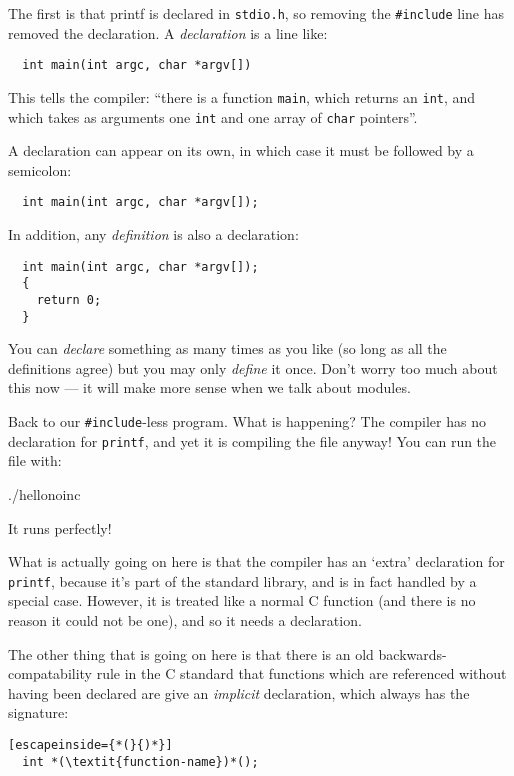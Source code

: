\documentclass[a4paper,10pt]{article}
\newcommand{\kw}[1]{\texttt{#1}}
\newcommand{\cfile}[1]{\texttt{#1}}
\begin{document}
The first is that printf is declared in \cfile{stdio.h}, so removing the
\verb!#include! line has removed the declaration. A \emph{declaration}
is a line like:

\begin{lstlisting}
  int main(int argc, char *argv[])
\end{lstlisting}


\noindent
This tells the compiler: ``there is a function \kw{main}, which
returns an \kw{int}, and which takes as arguments one \kw{int} and one
array of \kw{char} pointers''.

A declaration can appear on its own, in which case it must be followed
by a semicolon:

\begin{lstlisting}
  int main(int argc, char *argv[]);
\end{lstlisting}

\noindent
In addition, any \emph{definition} is also a declaration:

\begin{lstlisting}
  int main(int argc, char *argv[]);
  {
    return 0;
  }
\end{lstlisting}

\noindent
You can \emph{declare} something as many times as you like (so long as
all the definitions agree) but you may only \emph{define} it
once. Don't worry too much about this now --- it will make more sense
when we talk about modules.

Back to our \verb|#include|-less program. What is happening? The
compiler has no declaration for \kw{printf}, and yet it is compiling
the file anyway! You can run the file with:

./hellonoinc
\END

\noindent
It runs perfectly!

What is actually going on here is that the compiler has an `extra'
declaration for \kw{printf}, because it's part of the standard
library, and is in fact handled by a special case. However, it is
treated like a normal C function (and there is no reason it could not
be one), and so it needs a declaration.

The other thing that is going on here is that there is an old
backwards-compatability rule in the C standard that functions which
are referenced without having been declared are give an
\emph{implicit} declaration, which always has the signature:

\begin{lstlisting}[escapeinside={*(}{)*}]
  int *(\textit{function-name})*();
\end{lstlisting}
\end{document}
